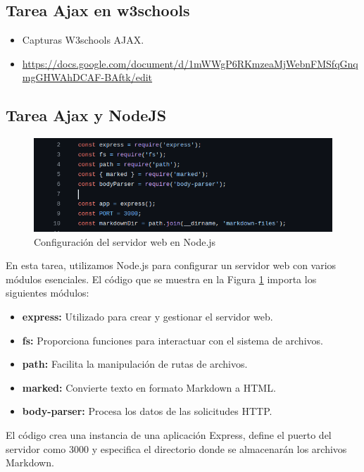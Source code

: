 \documentclass{article}
\begin{document}
\subsection{Tarea Ajax en w3schools}


\begin{itemize}
    \item Capturas W3schools AJAX.
    \item \url{https://docs.google.com/document/d/1mWWgP6RKmzeaMjWebnFMSfqGnqmgGHWAhDCAF-BAftk/edit}
\end{itemize}


\subsection{Tarea Ajax y NodeJS}

\begin{figure}[h]
    \centering
    \includegraphics[width=0.9\linewidth]{latex//img/3.1.png}
    \caption{Configuración del servidor web en Node.js}
    \label{fig:import-modules}
\end{figure}

En esta tarea, utilizamos Node.js para configurar un servidor web con varios módulos esenciales. El código que se muestra en la Figura \ref{fig:import-modules} importa los siguientes módulos:
\begin{itemize}
    \item \textbf{express:} Utilizado para crear y gestionar el servidor web.
    \item \textbf{fs:} Proporciona funciones para interactuar con el sistema de archivos.
    \item \textbf{path:} Facilita la manipulación de rutas de archivos.
    \item \textbf{marked:} Convierte texto en formato Markdown a HTML.
    \item \textbf{body-parser:} Procesa los datos de las solicitudes HTTP.
\end{itemize}

El código crea una instancia de una aplicación Express, define el puerto del servidor como 3000 y especifica el directorio donde se almacenarán los archivos Markdown.
\end{document}
